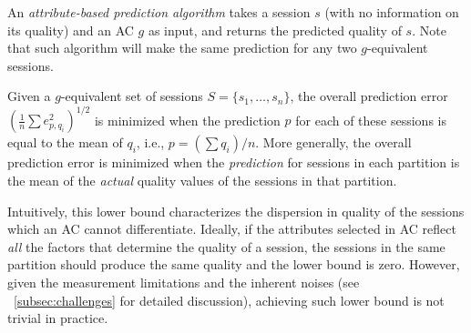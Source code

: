 
 An {\it
  attribute-based prediction algorithm} takes a session $s$ (with no
information on its quality) and an AC $g$ as input, and returns the
predicted quality of $s$. Note that such algorithm will make the same
prediction for any two $g$-equivalent sessions.



Given a $g$-equivalent set of sessions $S=\{s_1,\dots,s_n\}$, the
overall prediction error $\left(\frac{1}{n}\sum
  e_{p,q_i}^2\right)^{1/2}$ is minimized when the prediction $p$ for
each of these sessions is equal to the mean of $q_i$, i.e., $p = (\sum
q_i)/n$. More generally, the overall prediction error is minimized
when the \emph{prediction} for sessions in each partition is the mean
of the \emph{actual} quality values of the sessions in that partition.

Intuitively, this lower bound characterizes the dispersion in quality
of the sessions which an AC cannot differentiate. Ideally, if the
attributes selected in AC reflect \emph{all} the factors that
determine the quality of a session, the sessions in the same partition
should produce the same quality and the lower bound is zero. However,
given the measurement limitations and the inherent noises (see
\Section~\ref{subsec:challenges} for detailed discussion), achieving
such lower bound is not trivial in practice.


